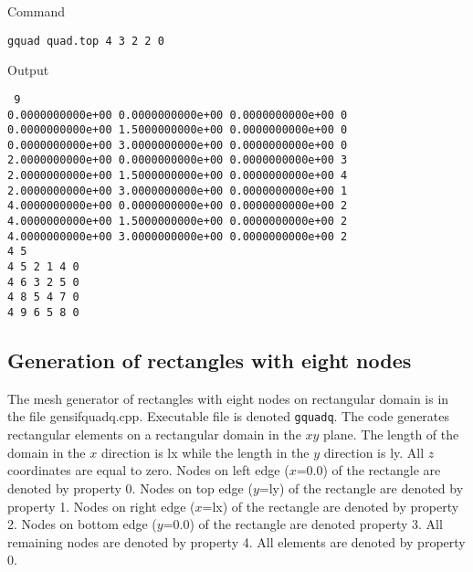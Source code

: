 \documentclass[12pt]{book}
\begin{document}
\noindent
Command

{\tt gquad quad.top 4 3 2 2 0}

\noindent
Output

\noindent
{\tt
9\\
0.0000000000e+00 0.0000000000e+00 0.0000000000e+00 0 \\
0.0000000000e+00 1.5000000000e+00 0.0000000000e+00 0 \\
0.0000000000e+00 3.0000000000e+00 0.0000000000e+00 0 \\
2.0000000000e+00 0.0000000000e+00 0.0000000000e+00 3 \\
2.0000000000e+00 1.5000000000e+00 0.0000000000e+00 4 \\
2.0000000000e+00 3.0000000000e+00 0.0000000000e+00 1 \\
4.0000000000e+00 0.0000000000e+00 0.0000000000e+00 2 \\
4.0000000000e+00 1.5000000000e+00 0.0000000000e+00 2 \\
4.0000000000e+00 3.0000000000e+00 0.0000000000e+00 2 \\
4 5\\
4 5 2 1 4 0\\
4 6 3 2 5 0\\
4 8 5 4 7 0\\
4 9 6 5 8 0\\
}

\subsection{Generation of rectangles with eight nodes}

The mesh generator of rectangles with eight nodes on rectangular domain is in the file gensifquadq.cpp.
Executable file is denoted {\tt gquadq}. The code generates rectangular elements on a rectangular domain
in the $xy$ plane. The length of the domain in the $x$ direction is lx while the length in the $y$ direction
is ly. All $z$ coordinates are equal to zero. Nodes on left edge ($x$=0.0) of the rectangle
are denoted by property 0. Nodes on top edge ($y$=ly) of the rectangle are denoted by property 1.
Nodes on right edge ($x$=lx) of the rectangle are denoted by property 2. Nodes on bottom edge ($y$=0.0)
of the rectangle are denoted property 3. All remaining nodes are denoted by property 4.
All elements are denoted by property 0.
\end{document}
